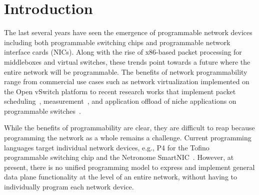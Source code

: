\vspace{-0.1in}
\section{Introduction}
The last several years have seen the emergence of programmable network devices
including both programmable switching chips and programmable network interface
cards (NICs). Along with the rise of x86-based packet processing for
middleboxes and virtual switches, these trends point towards a future where the
entire network will be programmable. The benefits of network programmability
range from commercial use cases such as network virtualization implemented on
the Open vSwitch platform to recent research works that
implement packet scheduling~\cite{pifo}, measurement~\cite{marple}, and application offload of niche
applications on programmable switches~\cite{netcache, netchain}.

While the benefits of programmability are clear, they are difficult to reap
because programming the network as a whole remains a challenge. Current
programming languages target individual network devices, e.g., P4 for the
Tofino~\cite{tofino} programmable switching chip and the Netronome SmartNIC~\cite{netronome}. However,
at present, there is no unified programming model to express and implement
general data plane functionality at the level of an entire network, without
having to individually program each network device.

